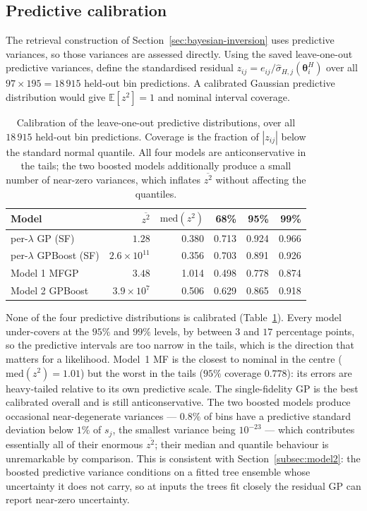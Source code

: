 \documentclass[12pt, letterpaper, oneside]{article}
\begin{document}
\subsection{Predictive calibration}
\label{sec:calibration}

The retrieval construction of Section~\ref{sec:bayesian-inversion} uses
predictive variances, so those variances are assessed directly. Using the
saved leave-one-out predictive variances, define the standardised residual
$z_{ij}=e_{ij}/\widehat\sigma_{H,j}(\bm\theta_i^H)$ over all
$97\times195=18\,915$ held-out bin predictions. A calibrated Gaussian
predictive distribution would give $\mathbb E[z^2]=1$ and nominal interval
coverage.

\begin{table}[t]
  \centering
  \small
  \caption{Calibration of the leave-one-out predictive distributions, over all
  $18\,915$ held-out bin predictions. Coverage is the fraction of $|z_{ij}|$
  below the standard normal quantile. All four models are anticonservative in
  the tails; the two boosted models additionally produce a small number of
  near-zero variances, which inflates $\overline{z^2}$ without affecting the
  quantiles.}
  \label{tab:calibration}
  \begin{tabular}{lrrrrr}
    \toprule
    Model & $\overline{z^2}$ & $\mathrm{med}(z^2)$
          & 68\% & 95\% & 99\% \\
    \midrule
    per-$\lambda$ GP (SF)      & $1.28$              & 0.380 & 0.713 & 0.924 & 0.966 \\
    per-$\lambda$ GPBoost (SF) & $2.6\times10^{11}$  & 0.356 & 0.703 & 0.891 & 0.926 \\
    Model 1 MFGP               & $3.48$              & 1.014 & 0.498 & 0.778 & 0.874 \\
    Model 2 GPBoost            & $3.9\times10^{7}$   & 0.506 & 0.629 & 0.865 & 0.918 \\
    \bottomrule
  \end{tabular}
\end{table}

None of the four predictive distributions is calibrated
(Table~\ref{tab:calibration}). Every model under-covers at the $95\%$ and
$99\%$ levels, by between $3$ and $17$ percentage points, so the predictive
intervals are too narrow in the tails, which is the direction that matters for
a likelihood. Model~1 MF is the closest to nominal in the centre
($\mathrm{med}(z^2)=1.01$) but the worst in the tails ($95\%$ coverage
$0.778$): its errors are heavy-tailed relative to its own predictive scale.
The single-fidelity GP is the best calibrated overall and is still
anticonservative. The two boosted models produce occasional near-degenerate
variances --- $0.8\%$ of bins have a predictive standard deviation below $1\%$
of $s_j$, the smallest variance being $10^{-23}$ --- which contributes
essentially all of their enormous $\overline{z^2}$; their median and quantile
behaviour is unremarkable by comparison. This is consistent with
Section~\ref{subsec:model2}: the boosted predictive variance conditions on a
fitted tree ensemble whose uncertainty it does not carry, so at inputs the
trees fit closely the residual GP can report near-zero uncertainty.
\end{document}
